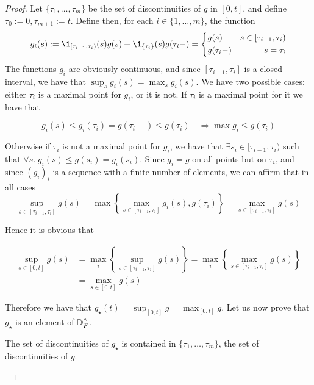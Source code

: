 \begin{proof}
	Let $\{\tau_1, \ldots, \tau_m\}$ be the set of discontinuities of $g$ in $[0,t]$, and define $\tau_0:=0, \tau_{m+1} := t$.
	Define then, for each $i\in\{1,\ldots, m\}$, the function
	\begin{equation*}
		g_i (s) := \1_{[\tau_{i-1}, \tau_i)}(s) g(s) + \1_{\{ \tau_i\}}(s) g(\tau_i-)
		=
		\left\{ 
		\begin{aligned}
			&g(s) 	& s \in [\tau_{i-1}, \tau_i)
			\\
			&g(\tau_i - ) 	& s = \tau_i
		\end{aligned}
		\right.
	\end{equation*}
	The functions $g_i$ are obviously continuous, and since $[\tau_{i-1}, \tau_i]$ is a closed interval, we have that $\sup_s g_i(s) = \max_s g_i(s)$.
	We have two possible cases: either $\tau_i$ is a maximal point for $g_i$, or it is not.
	If $\tau_i$ is a maximal point for it we have that 
	
	\begin{equation}
		g_i (s) \leq g_i (\tau_i) = g(\tau_i -) \leq g(\tau_i)
		\quad \Rightarrow 	\max g_i \leq g (\tau_i)
	\end{equation}
	
	Otherwise if $\tau_i$ is not a maximal point for $g_i$, we have that $\exists s_i \in [\tau_{i-1}, \tau_i)$ such that $\forall s.\; g_i (s) \leq g(s_i) = g_i (s_i) $.
	Since $g_i =g$ on all points but on $\tau_i$, and since $(g_i)_i$ is a sequence with a finite number of elements, we  can affirm that in all cases
	\begin{equation}
		\sup_{s \in [\tau_{i-1}, \tau_i]} g(s) = \max \left\{ \max_{s \in [\tau_{i-1}, \tau_i]} g_i(s), g(\tau_i) \right\} = \max_{s \in [\tau_{i-1}, \tau_i]} g(s)
	\end{equation}
	
	Hence it is obvious that
	
	\begin{align}
		\sup_{s \in [0,t]} g(s) 
		& = \max_i \left\{ \sup_{s \in [\tau_{i-1}, \tau_i]} g(s) \right\} = \max_i \left\{ \max_{s \in [\tau_{i-1}, \tau_i]} g(s) \right\}
		\\
		& = \max_{s \in [0,t]} g(s) 
	\end{align}
	
	Therefore we have that $g_\star(t) = \sup_{[0,t]} g = \max_{[0,t]} g$.
	Let us now prove that $g_\star$ is an element of $\mathbb{D}_F^\barwedge$.
	\begin{claim}
		The set of discontinuities of $g_\star$ is contained in $\{\tau_1, \ldots, \tau_m\}$, the set of discontinuities of $g$.
	\end{claim}
	

\end{proof}

